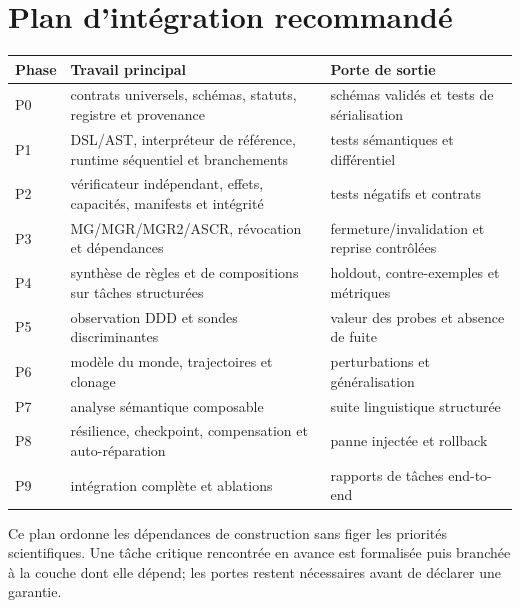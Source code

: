 \documentclass[11pt,a4paper]{article}
\begin{document}
\section{Plan d'intégration recommandé}
\begin{longtable}{p{}p{}p{}}
\toprule Phase & Travail principal & Porte de sortie \\
\midrule
P0 & contrats universels, schémas, statuts, registre et provenance & schémas validés et tests de sérialisation \\
P1 & DSL/AST, interpréteur de référence, runtime séquentiel et branchements & tests sémantiques et différentiel \\
P2 & vérificateur indépendant, effets, capacités, manifests et intégrité & tests négatifs et contrats \\
P3 & MG/MGR/MGR2/ASCR, révocation et dépendances & fermeture/invalidation et reprise contrôlées \\
P4 & synthèse de règles et de compositions sur tâches structurées & holdout, contre-exemples et métriques \\
P5 & observation DDD et sondes discriminantes & valeur des probes et absence de fuite \\
P6 & modèle du monde, trajectoires et clonage & perturbations et généralisation \\
P7 & analyse sémantique composable & suite linguistique structurée \\
P8 & résilience, checkpoint, compensation et auto-réparation & panne injectée et rollback \\
P9 & intégration complète et ablations & rapports de tâches end-to-end \\
\bottomrule
\end{longtable}
Ce plan ordonne les dépendances de construction sans figer les priorités scientifiques. Une tâche critique rencontrée en avance est formalisée puis branchée à la couche dont elle dépend; les portes restent nécessaires avant de déclarer une garantie.
\end{document}
